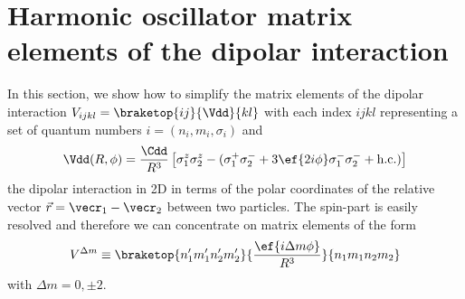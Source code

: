 \chapter{Harmonic oscillator matrix elements of the dipolar interaction}
\label{matrix_elements}

In this section, we show how to simplify the matrix elements of the dipolar interaction $V_{ijkl}=\braketop{ij}{\Vdd}{kl}$ with each index $ijkl$ representing a set of quantum numbers $i=(n_i,m_i,\sigma_i)$ and
\begin{align*}
\Vdd(R,\phi) =  \frac{\Cdd}{R^3} \left[
\sigma^z_1 \sigma^z_2 - (\sigma^+_1 \sigma^-_2 +3 \ef{2i\phi} \sigma^-_1 \sigma^-_2  +\text{h.c.})
\right]
\end{align*}
the dipolar interaction in 2D in terms of the polar coordinates of the relative vector $\vec{r}=\vecr_1-\vecr_2$ between two particles. The spin-part is easily resolved and therefore we can concentrate on matrix elements of the form
\begin{align*}
V^{\Delta m}\equiv\braketop{n_1'm_1'n_2'm_2'}{\frac{\ef{i\Delta m\phi}}{R^3}}{n_1m_1n_2m_2}
\end{align*}
with $\Delta m = 0, \pm 2$.

